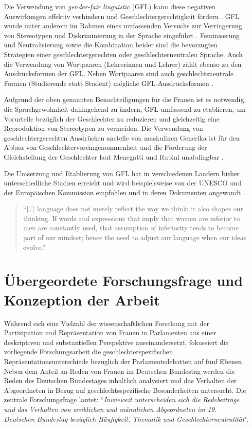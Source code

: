 \documentclass[12pt, 
    twoside=false, 
    bibliography=totoc, 
    numbers=endperiod, 
    headings=normal, 
    toc=chapterentrydotfill
    ]{scrbook}
\begin{document}
Die Verwendung von \emph{gender-fair linguistic} (GFL) kann diese negativen Auswirkungen effektiv verhindern und Geschlechtergerechtigkeit fördern \parencite[1]{menegatti_2017}. GFL wurde unter anderem im Rahmen eines umfassenden Versuchs zur Verringerung von Stereotypen und Diskriminierung in der Sprache eingeführt \parencite[2]{sczesny_2016}. Feminiserung und Neutralisierung sowie die Kombination beider sind die bevorzugten Strategien einer geschlechtergerechten oder geschlechterneutralen Sprache. Auch die Verwendung von Wortpaaren (Lehrerinnen und Lehrer) zählt ebenso zu den Ausdrucksformen der GFL. Neben Wortpaaren sind auch geschlechtsneutrale Formen (Studierende statt Student) mögliche GFL-Ausdrucksformen \parencite[2]{sczesny_2016}.

Aufgrund der oben genannten Benachteiligungen für die Frauen ist es notwendig, die Sprachgewohnheit dahingehend zu ändern, GFL umfassend zu etablieren, um Vorurteile bezüglich der Geschlechter zu reduzieren und gleichzeitig eine Reproduktion von Stereotypen zu vermeiden. Die Verwendung von geschlechtergerechten Ausdrücken anstelle von maskulinen Generika ist für den Abbau von Geschlechtervoreingenommenheit und die Förderung der Gleichstellung der Geschlechter laut Menegatti und Rubini unabdingbar \parencite*{menegatti_2017}.

Die Umsetzung und Etablierung von GFL hat in verschiedenen Ländern bisher unterschiedliche Stadien erreicht und wird beispielsweise von der UNESCO und der Europäischen Kommission empfohlen und in deren Dokumenten angewandt \parencite[4]{sczesny_2016}.

\begin{quote}
    \enquote{[…] language does not merely reflect the way we think: it also shapes our thinking. If words and expressions that imply that women are inferior to men are constantly used, that assumption of inferiority tends to become part of our mindset; hence the need to adjust our language when our ideas evolve.} \parencite {unesco_2011} 
\end{quote}

\chapter{Übergeordete Forschungsfrage und Konzeption der Arbeit}

Während sich eine Vielzahl der wissenschaftlichen Forschung mit der Partizipation und Repräsentation von Frauen in Parlamenten aus einer deskriptiven und substantiellen Perspektive auseinandersetzt, fokussiert die vorliegende Forschungsarbeit die geschlechterspezifischen Repräsentationsunterschiede bezüglich der Parlamentsdebatten auf fünf Ebenen.
Neben dem Anteil an Reden von Frauen im Deutschen Bundestag werden die Reden des Deutschen Bundestages inhaltlich analysiert und das Verhalten der Abgeordneten in Bezug auf geschlechtsspezifische Besonderheiten untersucht. Die zentrale Forschungsfrage lautet: \enquote{\emph{Inwieweit unterscheiden sich die Redebeiträge und das Verhalten von weiblichen und männlichen Abgeordneten im 19. Deutschen Bundestag bezüglich Häufigkeit, Thematik und Geschlechterneutralität}}.
\end{document}
